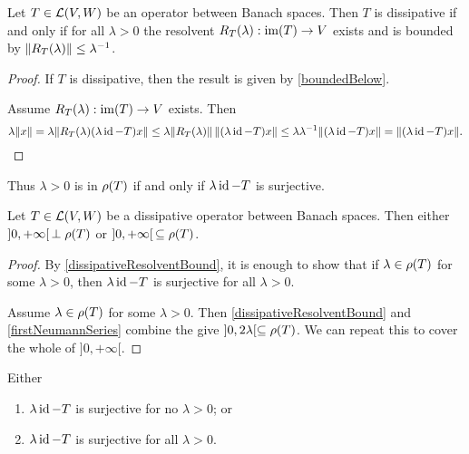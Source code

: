\begin{lemma} \label{dissipativeResolventBound}
Let $T\in \operatorname{\mathcal{L}}(V, W)$ be an operator between Banach spaces. Then $T$ is dissipative \textup{if and only if} for all $\lambda>0$ the resolvent $R_T(\lambda): \operatorname{im}(T)\to V$ exists and is bounded by $\lVert R_T(\lambda)\rVert \leq \lambda^{-1}$.
\end{lemma}
\begin{proof}
If $T$ is dissipative, then the result is given by \ref{boundedBelow}.

Assume $R_T(\lambda): \operatorname{im}(T)\to V$ exists. Then
\[ \lambda\lVert x\rVert = \lambda\lVert R_T(\lambda)(\lambda\operatorname{id}-T)x\rVert \leq \lambda \lVert R_T(\lambda)\rVert\,\lVert(\lambda\operatorname{id}-T)x\rVert \leq \lambda\lambda^{-1}\lVert(\lambda\operatorname{id}-T)x\rVert = \lVert(\lambda\operatorname{id}-T)x\rVert. \]
\end{proof}

Thus $\lambda>0$ is in $\rho(T)$ if and only if $\lambda\operatorname{id} - T$ is surjective.


\begin{proposition} \label{spectrumDissipativeOperator}
Let $T\in \operatorname{\mathcal{L}}(V, W)$ be a dissipative operator between Banach spaces. Then either $]0,+\infty[\,\perp \rho(T)$ or $]0,+\infty[\,\subseteq \rho(T)$.
\end{proposition}
\begin{proof}
By \ref{dissipativeResolventBound}, it is enough to show that if $\lambda\in\rho(T)$ for some $\lambda >0$, then $\lambda\operatorname{id} - T$ is surjective for all $\lambda>0$.

Assume $\lambda\in\rho(T)$ for some $\lambda >0$. Then \ref{dissipativeResolventBound} and \ref{firstNeumannSeries} combine the give $]0, 2\lambda[ \subseteq \rho(T)$. We can repeat this to cover the whole of $]0,+\infty[$.
\end{proof}
\begin{corollary} \label{rangeDisjunctionDissipativeOperator}
Either
\begin{enumerate}
\item $\lambda\operatorname{id}-T$ is surjective for no $\lambda > 0$; or
\item $\lambda\operatorname{id}-T$ is surjective for all $\lambda > 0$.
\end{enumerate}
\end{corollary}

